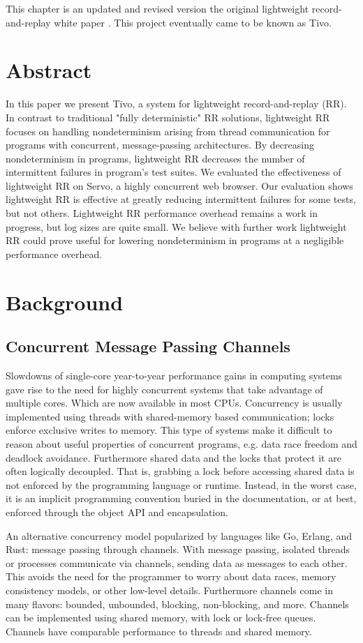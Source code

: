 This chapter is an updated and revised version the original lightweight record-and-replay white paper \citep{tivo}. This project eventually came to be known as Tivo.
\section{Abstract}
     In this paper we present Tivo, a system for lightweight record-and-replay (RR). In contrast to traditional "fully deterministic" RR solutions, lightweight RR focuses on handling nondeterminism arising from thread communication for programs with concurrent, message-passing architectures. By decreasing nondeterminism in programs, lightweight RR decreases the number of intermittent failures in program's test suites. We evaluated the effectiveness of lightweight RR on Servo, a highly concurrent web browser. Our evaluation shows lightweight RR is effective at greatly reducing intermittent failures for some tests, but not others. Lightweight RR performance overhead remains a work in progress, but log sizes are quite small. We believe with further work lightweight RR could prove useful for lowering nondeterminism in programs at a negligible performance overhead.
\section{Background}

\subsection{Concurrent Message Passing Channels}
Slowdowns of single-core year-to-year performance gains in computing systems gave rise to the need for highly concurrent systems that take advantage of multiple cores. Which are now available
in most CPUs. Concurrency is usually implemented using threads with shared-memory based communication; locks enforce exclusive writes to memory. This type of systems make it difficult to reason about useful properties of concurrent programs, e.g. data race freedom and deadlock avoidance. Furthermore shared data and the locks that protect it are often logically decoupled. That is, grabbing a lock before accessing shared data is not enforced by the programming language or runtime. Instead, in the worst case, it is an implicit programming convention buried in the documentation, or at best, enforced through the object API and encapsulation.

An alternative concurrency model popularized by languages like Go, Erlang, and Rust: message passing through channels. With message passing, isolated threads or processes communicate via channels, sending data as messages to each other. This avoids the need for the programmer to worry about data races, memory consistency models, or other low-level details. Furthermore channels come in many flavors: bounded, unbounded, blocking, non-blocking, and more. Channels can be implemented using
shared memory, with lock or lock-free queues. Channels have comparable performance to threads and shared memory.

